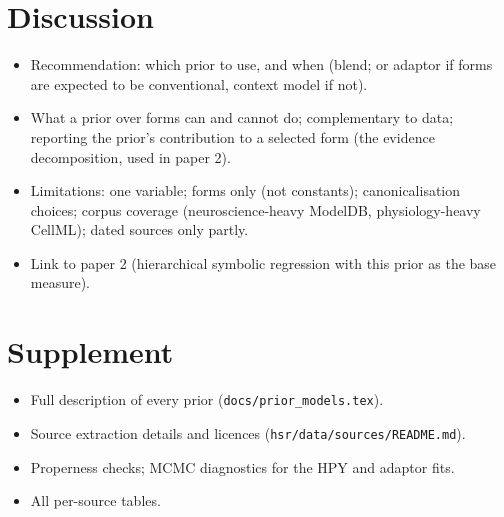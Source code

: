 \documentclass[11pt]{article}
\begin{document}
\section{Discussion}
\begin{itemize}
  \item Recommendation: which prior to use, and when (blend; or adaptor if forms are expected to be
  conventional, context model if not).
  \item What a prior over forms can and cannot do; complementary to data; reporting the prior's
  contribution to a selected form (the evidence decomposition, used in paper 2).
  \item Limitations: one variable; forms only (not constants); canonicalisation choices; corpus
  coverage (neuroscience-heavy ModelDB, physiology-heavy CellML); dated sources only partly.
  \item Link to paper 2 (hierarchical symbolic regression with this prior as the base measure).
\end{itemize}

\section*{Supplement}
\begin{itemize}
  \item Full description of every prior (\texttt{docs/prior\_models.tex}).
  \item Source extraction details and licences (\texttt{hsr/data/sources/README.md}).
  \item Properness checks; MCMC diagnostics for the HPY and adaptor fits.
  \item All per-source tables.
\end{itemize}
\end{document}
